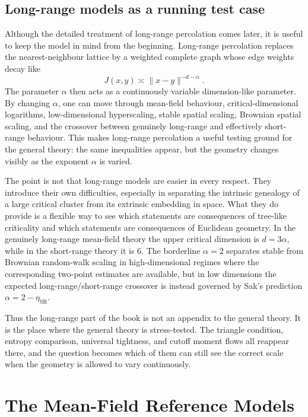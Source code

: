 \documentclass[11pt,reqno]{book}
\numberwithin{equation}{chapter}
\theoremstyle{plain}
\theoremstyle{definition}
\theoremstyle{remark}
\newcommand{\1}{\mathbf 1}
\newcommand{\norm}[1]{\lVert #1\rVert}
\begin{document}
\section{Long-range models as a running test case}

Although the detailed treatment of long-range percolation comes later, it is useful to keep the model in mind from the beginning. Long-range percolation replaces the nearest-neighbour lattice by a weighted complete graph whose edge weights decay like
\[
  J(x,y)\asymp \norm{x-y}^{-d-\alpha}.
\]
The parameter \(\alpha\) then acts as a continuously variable dimension-like parameter. By changing \(\alpha\), one can move through mean-field behaviour, critical-dimensional logarithms, low-dimensional hyperscaling, stable spatial scaling, Brownian spatial scaling, and the crossover between genuinely long-range and effectively short-range behaviour. This makes long-range percolation a useful testing ground for the general theory: the same inequalities appear, but the geometry changes visibly as the exponent \(\alpha\) is varied.

The point is not that long-range models are easier in every respect. They introduce their own difficulties, especially in separating the intrinsic genealogy of a large critical cluster from its extrinsic embedding in space. What they do provide is a flexible way to see which statements are consequences of tree-like criticality and which statements are consequences of Euclidean geometry. In the genuinely long-range mean-field theory the upper critical dimension is \(d=3\alpha\), while in the short-range theory it is \(6\). The borderline \(\alpha=2\) separates stable from Brownian random-walk scaling in high-dimensional regimes where the corresponding two-point estimates are available, but in low dimensions the expected long-range/short-range crossover is instead governed by Sak's prediction \(\alpha=2-\eta_{\mathrm{SR}}\).

Thus the long-range part of the book is not an appendix to the general theory. It is the place where the general theory is stress-tested. The triangle condition, entropy comparison, universal tightness, and cutoff moment flows all reappear there, and the question becomes which of them can still see the correct scale when the geometry is allowed to vary continuously.

\chapter{The Mean-Field Reference Models}
\end{document}
